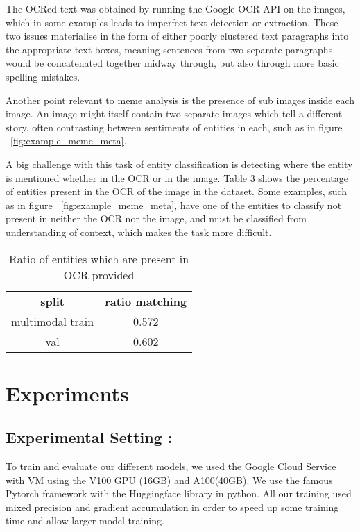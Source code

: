 \documentclass[11pt]{article}
\begin{document}
The OCRed text was obtained by running the Google OCR API on the images, which in some examples leads to imperfect text detection or extraction. These two issues materialise in the form of either poorly clustered text paragraphs into the appropriate text boxes, meaning sentences from two separate paragraphs would be concatenated together midway through, but also through more basic spelling mistakes.

Another point relevant to meme analysis is the presence of sub images inside each image. An image might itself contain two separate images which tell a different story, often contrasting between sentiments of entities in each, such as in figure ~\ref{fig:example_meme_meta}. 

A big challenge with this task of entity classification is detecting where the entity is mentioned whether in the OCR or in the image. Table 3 shows the percentage of entities present in the OCR of the image in the dataset. Some examples, such as in figure ~\ref{fig:example_meme_meta}, have one of the entities to classify not present in neither the OCR nor the image, and must be classified from understanding of context, which makes the task more difficult.

\begin{table} 
\centering
\begin{tabular}{ |c||c|  }
 \hline
 \textbf{split} & \textbf{ratio matching} \\multimodal
 \hline
train  & 0.572\\ %
\hline
val  & 0.602\\ %
 \hline
\end{tabular}
\caption{ Ratio of entities which are present in OCR provided}
 \label{fig:ratio_entity}
\end{table}

\section{Experiments}
\subsection{Experimental Setting : }
To train and evaluate our different models, we used the Google Cloud Service with VM using the V100 GPU (16GB) and A100(40GB). We use the famous Pytorch framework with the Huggingface library in python. All our training used mixed precision and gradient accumulation in order to speed up some training time and allow larger model training.
\end{document}
